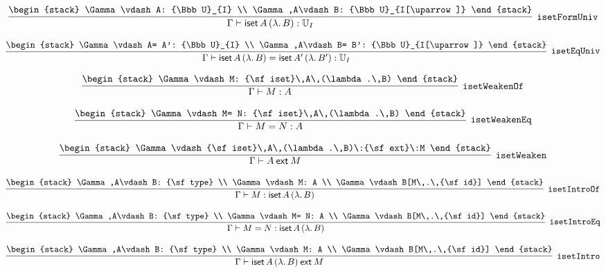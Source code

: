\[
\infer[{\tt isetFormUniv}]{\Gamma \vdash {\sf iset}\,A\,(\lambda .\,B): {\Bbb U}_{I}}{
\begin{stack}
\Gamma \vdash A: {\Bbb U}_{I}
\\
\Gamma ,A\vdash B: {\Bbb U}_{I[\uparrow ]}
\end{stack}}
\]

\[
\infer[{\tt isetEqUniv}]{\Gamma \vdash {\sf iset}\,A\,(\lambda .\,B)= {\sf iset}\,A'\,(\lambda .\,B'): {\Bbb U}_{I}}{
\begin{stack}
\Gamma \vdash A= A': {\Bbb U}_{I}
\\
\Gamma ,A\vdash B= B': {\Bbb U}_{I[\uparrow ]}
\end{stack}}
\]

\[
\infer[{\tt isetWeakenOf}]{\Gamma \vdash M: A}{
\begin{stack}
\Gamma \vdash M: {\sf iset}\,A\,(\lambda .\,B)
\end{stack}}
\]

\[
\infer[{\tt isetWeakenEq}]{\Gamma \vdash M= N: A}{
\begin{stack}
\Gamma \vdash M= N: {\sf iset}\,A\,(\lambda .\,B)
\end{stack}}
\]

\[
\infer[{\tt isetWeaken}]{\Gamma \vdash A\:{\sf ext}\:M}{
\begin{stack}
\Gamma \vdash {\sf iset}\,A\,(\lambda .\,B)\:{\sf ext}\:M
\end{stack}}
\]

\[
\infer[{\tt isetIntroOf}]{\Gamma \vdash M: {\sf iset}\,A\,(\lambda .\,B)}{
\begin{stack}
\Gamma ,A\vdash B: {\sf type}
\\
\Gamma \vdash M: A
\\
\Gamma \vdash B[M\,.\,{\sf id}]
\end{stack}}
\]

\[
\infer[{\tt isetIntroEq}]{\Gamma \vdash M= N: {\sf iset}\,A\,(\lambda .\,B)}{
\begin{stack}
\Gamma ,A\vdash B: {\sf type}
\\
\Gamma \vdash M= N: A
\\
\Gamma \vdash B[M\,.\,{\sf id}]
\end{stack}}
\]

\[
\infer[{\tt isetIntro}]{\Gamma \vdash {\sf iset}\,A\,(\lambda .\,B)\:{\sf ext}\:M}{
\begin{stack}
\Gamma ,A\vdash B: {\sf type}
\\
\Gamma \vdash M: A
\\
\Gamma \vdash B[M\,.\,{\sf id}]
\end{stack}}
\]

